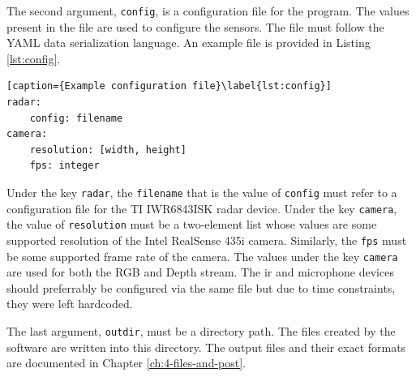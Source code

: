 The second argument, \texttt{config}, is a configuration file for the program.
The values present in the file are used to configure the sensors.
The file must follow the YAML data serialization language.
An example file is provided in Listing \ref{lst:config}.

\begin{lstlisting}[caption={Example configuration file}\label{lst:config}]
radar:
    config: filename
camera:
    resolution: [width, height]
    fps: integer
\end{lstlisting}

Under the key \texttt{radar}, the \texttt{filename} that is the value of \texttt{config} must refer to a configuration file for the TI IWR6843ISK radar device.
Under the key \texttt{camera}, the value of \texttt{resolution} must be a two-element list whose values are some supported resolution of the Intel RealSense 435i camera.
Similarly, the \texttt{fps} must be some supported frame rate of the camera.
The values under the key \texttt{camera} are used for both the RGB and Depth stream.
The \gls{ir} and microphone devices should preferrably be configured via the same file but due to time constraints,
they were left hardcoded.

The last argument, \texttt{outdir}, must be a directory path.
The files created by the software are written into this directory.
The output files and their exact formats are documented in Chapter \ref{ch:4-files-and-post}.
